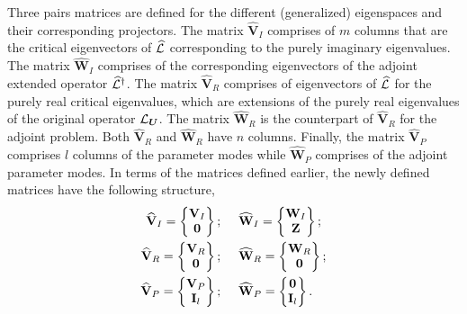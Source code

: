 Three pairs matrices are defined for the different (generalized) eigenspaces and their corresponding projectors. The matrix $\mathbf{\widehat{V}}_{I}$ comprises of $m$ columns that are the critical eigenvectors of $\mathcal{\widehat{L}}$ corresponding to the purely imaginary eigenvalues. The matrix $\mathbf{\widehat{W}}_{I}$ comprises of the corresponding eigenvectors of the adjoint extended operator $\mathcal{\widehat{L}}^{\dagger}$. The matrix $\mathbf{\widehat{V}}_{R}$ comprises of eigenvectors of $\mathcal{\widehat{L}}$ for the purely real critical eigenvalues, which are extensions of the purely real eigenvalues of the original operator $\mathcal{L}_{\boldsymbol{U}}$. The matrix $\mathbf{\widehat{W}}_{R}$ is the counterpart of $\mathbf{\widehat{V}}_{R}$ for the adjoint problem. Both $\mathbf{\widehat{V}}_{R}$ and $\mathbf{\widehat{W}}_{R}$ have $n$ columns. 
Finally, the matrix $\mathbf{\widehat{V}}_{P}$ comprises $l$ columns of the parameter modes while $\mathbf{\widehat{W}}_{P}$ comprises of the adjoint parameter modes. In terms of the matrices defined earlier, the newly defined matrices have the following structure, 
\begin{subequations}
	\begin{align}
		\mathbf{\widehat{V}}_{I} = \begin{Bmatrix}
			\mathbf{V}_{I} \\ 
			\mathbf{0}
		\end{Bmatrix}; \hspace{5mm} &
		\mathbf{\widehat{W}}_{I} = \begin{Bmatrix}
			\mathbf{W}_{I} \\ 
			\mathbf{Z}
		\end{Bmatrix}; \\
		\mathbf{\widehat{V}}_{R} = \begin{Bmatrix}
			\mathbf{V}_{R} \\ 
			\mathbf{0}
		\end{Bmatrix}; \hspace{5mm} &
		\mathbf{\widehat{W}}_{R} = \begin{Bmatrix}
			\mathbf{W}_{R} \\ 
			\mathbf{0}
		\end{Bmatrix}; \\
		\mathbf{\widehat{V}}_{P} = \begin{Bmatrix}
			\mathbf{V}_{P} \\ 
			\mathbf{I}_{l}
		\end{Bmatrix}; \hspace{5mm} &
		\mathbf{\widehat{W}}_{P} = \begin{Bmatrix}
			\mathbf{0} \\ 
			\mathbf{I}_{l}
		\end{Bmatrix}.
	\end{align}
\end{subequations}
